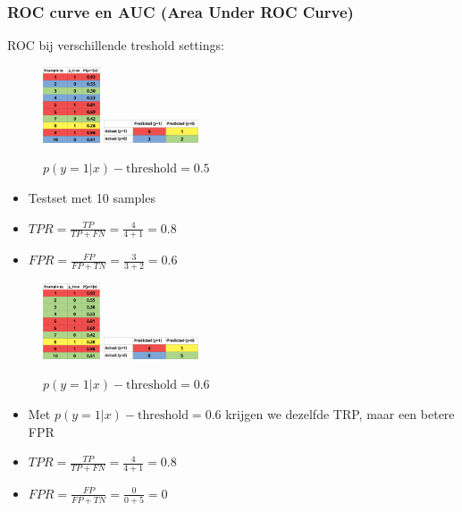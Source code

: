 \documentclass{article}
\begin{document}
\subsubsection{ROC curve en AUC (Area Under ROC Curve)}

ROC bij verschillende treshold settings: 

\begin{figure}[H]
    \centering
    \includegraphics[width=0.15\textwidth]{roc-treshold.png}
    \includegraphics[width=0.25\textwidth]{roc-treshold2.png}
    \caption{$p(y=1 | x) - \text{threshold} = 0.5$ }
\end{figure}

\begin{itemize}
    \item Testset met 10 samples
    \item $TPR = \frac{TP}{TP + FN} = \frac{4}{4 + 1} = 0.8$
    \item $FPR = \frac{FP}{FP + TN} = \frac{3}{3 + 2} = 0.6$
\end{itemize}

\begin{figure}[H]
    \centering
    \includegraphics[width=0.15\textwidth]{roc-treshold3.png}
    \includegraphics[width=0.25\textwidth]{roc-treshold4.png}
    \caption{$p(y=1 | x) - \text{threshold} = 0.6$ }
\end{figure}

\begin{itemize}
    \item Met $p(y=1 | x) - \text{threshold} = 0.6$ krijgen we dezelfde TRP, maar een betere FPR
    \item $TPR = \frac{TP}{TP + FN} = \frac{4}{4 + 1} = 0.8$
    \item $FPR = \frac{FP}{FP + TN} = \frac{0}{0 + 5} = 0$
\end{itemize}
\end{document}
